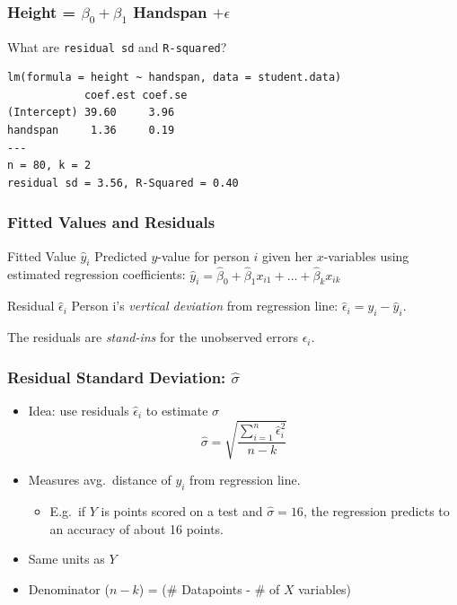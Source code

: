 \documentclass[handout]{beamer}
\begin{document}
\begin{frame}[fragile]
\frametitle{Height = $\beta_0 + \beta_1$ Handspan $+ \epsilon$}
\alert{What are \texttt{residual sd} and \texttt{R-squared}?}
\footnotesize
\begin{verbatim}
lm(formula = height ~ handspan, data = student.data)
            coef.est coef.se
(Intercept) 39.60     3.96  
handspan     1.36     0.19  
---
n = 80, k = 2
residual sd = 3.56, R-Squared = 0.40
\end{verbatim}
\end{frame}

\begin{frame}
\frametitle{Fitted Values and Residuals}

\begin{block}{Fitted Value $\widehat{y}_i$}
Predicted $y$-value for person $i$ given her $x$-variables using estimated regression coefficients: \alert{$\widehat{y}_i = \widehat{\beta}_0 + \widehat{\beta}_1 x_{i1} + \hdots + \widehat{\beta}_k x_{ik}$}
\end{block}


\begin{block}{Residual $\widehat{\epsilon}_i$}
  Person i's \emph{vertical deviation} from regression line: \alert{$\widehat{\epsilon}_i = y_i - \widehat{y}_i$}. 
\end{block}

\vspace{1em}
\alert{The residuals are \emph{stand-ins} for the unobserved errors $\epsilon_i$.}

\end{frame}
\begin{frame}
\frametitle{Residual Standard Deviation: $\widehat{\sigma}$}
	\begin{itemize}
    \item Idea: use residuals $\widehat{\epsilon}_i$ to estimate $\sigma$
	$$\widehat{\sigma}  = \sqrt{\frac{\sum_{i=1}^n \widehat{\epsilon}_i^2}{n -k}}$$ 
		\item Measures avg.\ distance of $y_i$ from regression line.
				\begin{itemize}
					\item E.g.\ if $Y$ is points scored on a test and $\widehat{\sigma}=16$, the regression predicts to an accuracy of about 16 points. 
				\end{itemize}
	\item Same units as $Y$ %
	\item Denominator  ($n-k$) = (\# Datapoints - \# of $X$ variables) 
	\end{itemize}

\end{frame}
\end{document}
